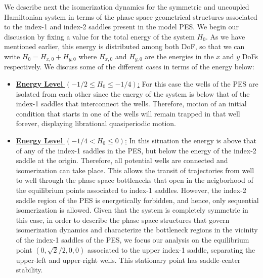 \documentclass[10pt,aps,onecolumn,superscriptaddress]{revtex4-2}
\begin{document}
We describe next the isomerization dynamics for the symmetric and uncoupled Hamiltonian system in terms of the phase space geometrical structures associated to the index-1 and index-2 saddles present in the model PES. We begin our discussion by fixing a value for the total energy of the system $H_0$. As we have mentioned earlier, this energy is distributed among both DoF, so that we can write $H_0 = H_{x,0} + H_{y,0}$ where $H_{x,0} $ and $H_{y,0}$ are the energies in the $x$ and $y$ DoFs respectively. We discuss some of the different cases in terms of the energy below: 
\begin{itemize}
	\item \underline{\textbf{Energy Level} $(-1/2 \leq H_0 \leq -1/4)$:} For this case the wells of the PES are isolated from each other since the energy of the system is below that of the index-1 saddles that interconnect the wells. Therefore, motion of an initial condition that starts in one of the wells will remain trapped in that well forever, displaying librational quasiperiodic motion.
	
	\item \underline{\textbf{Energy Level} $(-1/4 < H_0 \leq 0)$:} In this situation the energy is above that of any of the index-1 saddles in the PES, but below the energy of the index-2 saddle at the origin. Therefore, all potential wells are connected and isomerization can take place. This allows the transit of trajectories from well to well through the phase space bottlenecks that open in the neigborhood of the equilibrium points associated to index-1 saddles. However, the index-2 saddle region of the PES is energetically forbidden, and hence, only sequential isomerization is allowed. Given that the system is completely symmetric in this case, in order to describe the phase space structures that govern isomerization dynamics and characterize the bottleneck regions in the vicinity of the index-1 saddles of the PES, we focus our analysis on the equilibrium point $(0,\sqrt{2}/2,0,0)$ associated to the upper index-1 saddle, separating the upper-left and upper-right wells. This stationary point has saddle-center stability.
\end{itemize}
\end{document}
